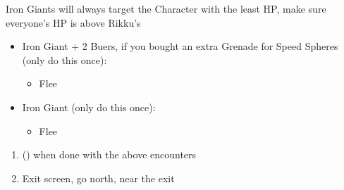 \begin{encounters}
    Iron Giants will always target the Character with the least HP, make sure everyone's HP is above Rikku's
    \begin{itemize}
        \item Iron Giant + 2 Buers, if you bought an extra Grenade for Speed Spheres (only do this once):
        \begin{itemize}
            \switch{\tidus}{\rikku}
            \rikkuf Use Grenade
            \wakkaf Defend
            \auronf Defend
            \enemyf Attacks \rikku
            \switch{\wakka}{\tidus}
            \item Flee
        \end{itemize}
        \item Iron Giant (only do this once):
        \begin{itemize}
            \tidusf Defend
            \switch{\wakka}{\rikku}
            \rikkuf Steal Light Curtain
            \auronf Defend
            \enemyf Attacks \rikku
            \item Flee
        \end{itemize}
    \end{itemize}
\end{encounters}
\begin{enumerate}[resume]
    \item \formation{\tidus}{\wakka}{\auron} (\swap{\wakka}{\rikku}) when done with the above encounters
    \item Exit screen, go north, near the exit
\end{enumerate}
